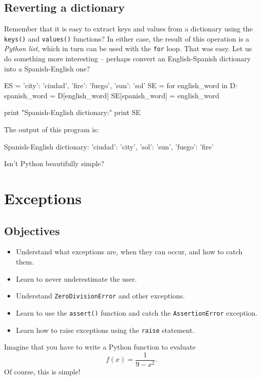 \subsection{Reverting a dictionary}

Remember that it is easy to extract keys and values from a dictionary using the 
{\tt keys()} and {\tt values()} functions? In either case, the result of this operation 
is a {\em Python list}, which in turn can be used with the {\tt for} loop. That was easy. Let us do something more interesting -- 
perhaps convert an English-Spanish dictionary into a Spanish-English one? 

\begin{bluecode}
ES = {'city': 'ciudad', 'fire': 'fuego', 'sun': 'sol'}
SE = {}
for english_word in D:
    spanish_word = D[english_word]
    SE[spanish_word] = english_word
    
print "Spanish-English dictionary:"
print SE
\end{bluecode}
The output of this program is:

\begin{bluecode}
Spanish-English dictionary:
{'ciudad': 'city', 'sol': 'sun', 'fuego': 'fire'}
\end{bluecode}
Isn't Python beautifully simple?



\section{Exceptions}

\subsection{Objectives}

\begin{itemize}
\item Understand what exceptions are, when they can occur, and how to catch them.
\item Learn to never underestimate the user.
\item Understand {\tt ZeroDivisionError} and other exceptions.
\item Learn to use the {\tt assert()} function and catch the {\tt AssertionError} exception.
\item Learn how to raise exceptions using the {\tt raise} statement.
\end{itemize}
Imagine that you have to write a Python function to evaluate
$$
f(x) = \frac{1}{9 - x^2}.
$$
Of course, this is simple!

